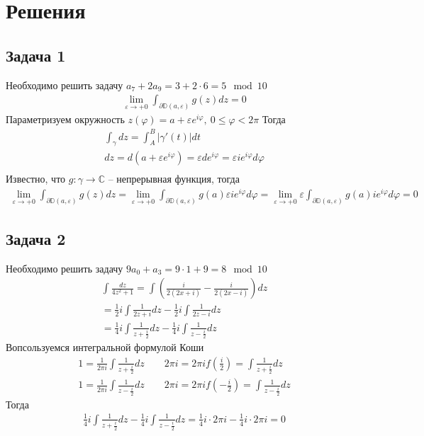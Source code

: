 
\newpage
\section*{Решения}
\subsection*{Задача 1}
	Необходимо решить задачу $a_7 + 2a_9 = 3 + 2 \cdot 6 = 5 \mod 10$
	\begin{gather*}
		\lim\limits_{\varepsilon \to +0} \int_{\partial \mathbb{D} (a,\varepsilon)} g(z)dz = 0
	\end{gather*}
	Параметризуем окружность
	$z(\varphi) = a + \varepsilon e^{i \varphi},\ 0 \leqslant \varphi < 2\pi$
	Тогда
	\begin{gather*}
		\int_{\gamma} dz = \int_{A}^{B} |\gamma'(t)|dt\\
		dz
		= d(a + \varepsilon e^{i \varphi})
		= \varepsilon d e^{i \varphi}
		= \varepsilon i e^{i \varphi} d \varphi\\
	\end{gather*}
	Известно, что $g: \gamma \to \mathbb{C}$ -- непрерывная функция, тогда
	\begin{gather*}
		\lim\limits_{\varepsilon \to +0} \int_{\partial \mathbb{D} (a, \varepsilon)} g(z) dz
		= \lim\limits_{\varepsilon \to +0} \int_{\partial \mathbb{D} (a, \varepsilon)} g(a) \varepsilon i e^{i \varphi} d \varphi 
		= \lim\limits_{\varepsilon \to +0} \varepsilon\int_{\partial \mathbb{D} (a, \varepsilon)} g(a)i e^{i \varphi} d \varphi
		= 0
	\end{gather*}
\vskip 0.4in

\subsection*{Задача 2}
	Необходимо решить задачу $9a_0 + a_3 = 9 \cdot 1 + 9 = 8 \mod 10$
	\begin{gather*}
	\int \frac{dz}{4z^2 + 1}
	= \int \left(\frac{i}{2(2x+i)} - \frac{i}{2(2x - i)} \right)dz\\
	= \frac{1}{2}i \int \frac{1}{2z + i}dz - \frac{1}{2}i \int \frac{1}{2z - i} dz\\
	= \frac{1}{4}i \int \frac{1}{z + \frac{i}{2}}dz - \frac{1}{4}i \int \frac{1}{z - \frac{i}{2}} dz
	\end{gather*}
	Вопсользуемся интегральной формулой Коши
	\begin{gather*}
		1 = \frac{1}{2\pi i} \int \frac{1}{z + \frac{i}{2}} dz\qquad
		2\pi i = 2\pi i f(\frac{i}{2}) = \int \frac{1}{z + \frac{i}{2}}dz\\
		1 = \frac{1}{2\pi i} \int \frac{1}{z - \frac{i}{2}} dz\qquad
		2\pi i = 2\pi i f(-\frac{i}{2}) = \int \frac{1}{z - \frac{i}{2}}dz
	\end{gather*}
	Тогда
	\begin{gather*}
		\frac{1}{4}i \int \frac{1}{z + \frac{i}{2}}dz - \frac{1}{4}i \int \frac{1}{z - \frac{i}{2}} dz
		= \frac{1}{4}i \cdot 2 \pi i - \frac{1}{4}i \cdot 2 \pi i
		= 0
	\end{gather*}
\vskip 0.4in

